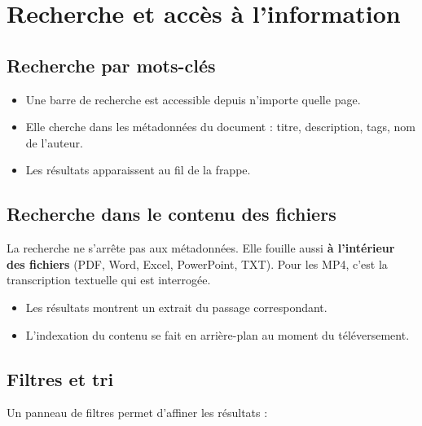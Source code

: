\documentclass[a4paper,12pt,french]{article}
\begin{document}

\section{Recherche et accès à l'information}

\subsection{Recherche par mots-clés}

\begin{itemize}[leftmargin=1.5em]
  \item Une barre de recherche est accessible depuis n'importe quelle page.
  \item Elle cherche dans les métadonnées du document : titre, description, tags, nom de l'auteur.
  \item Les résultats apparaissent au fil de la frappe.
\end{itemize}

\subsection{Recherche dans le contenu des fichiers}

La recherche ne s'arrête pas aux métadonnées. Elle fouille aussi \textbf{à l'intérieur des fichiers} (PDF, Word, Excel, PowerPoint, TXT). Pour les MP4, c'est la transcription textuelle qui est interrogée.

\begin{itemize}[leftmargin=1.5em]
  \item Les résultats montrent un extrait du passage correspondant.
  \item L'indexation du contenu se fait en arrière-plan au moment du téléversement.
\end{itemize}

\subsection{Filtres et tri}

Un panneau de filtres permet d'affiner les résultats :
\end{document}
